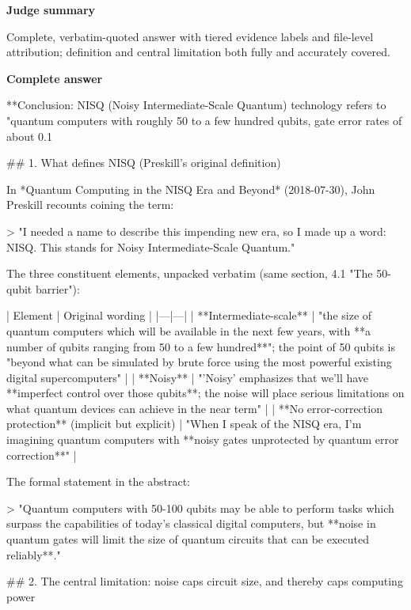 \documentclass[10pt]{article}
\begin{document}
\textbf{Judge summary}
\begin{EvidenceText}
Complete, verbatim-quoted answer with tiered evidence labels and file-level attribution; definition and central limitation both fully and accurately covered.
\end{EvidenceText}

\textbf{Complete answer}
\begin{AnswerText}
**Conclusion: NISQ (Noisy Intermediate-Scale Quantum) technology refers to "quantum computers with roughly 50 to a few hundred qubits, gate error rates of about 0.1%

## 1. What defines NISQ (Preskill's original definition)

In *Quantum Computing in the NISQ Era and Beyond* (2018-07-30), John Preskill recounts coining the term:

> "I needed a name to describe this impending new era, so I made up a word: NISQ. This stands for Noisy Intermediate-Scale Quantum."

The three constituent elements, unpacked verbatim (same section, 4.1 "The 50-qubit barrier"):

| Element | Original wording |
|---|---|
| **Intermediate-scale** | "the size of quantum computers which will be available in the next few years, with **a number of qubits ranging from 50 to a few hundred**"; the point of 50 qubits is "beyond what can be simulated by brute force using the most powerful existing digital supercomputers" |
| **Noisy** | "'Noisy' emphasizes that we'll have **imperfect control over those qubits**; the noise will place serious limitations on what quantum devices can achieve in the near term" |
| **No error-correction protection** (implicit but explicit) | "When I speak of the NISQ era, I'm imagining quantum computers with **noisy gates unprotected by quantum error correction**" |

The formal statement in the abstract:

> "Quantum computers with 50-100 qubits may be able to perform tasks which surpass the capabilities of today's classical digital computers, but **noise in quantum gates will limit the size of quantum circuits that can be executed reliably**."

## 2. The central limitation: noise caps circuit size, and thereby caps computing power


\end{AnswerText}
\end{document}
